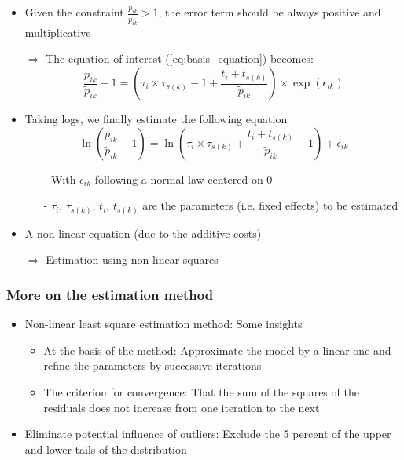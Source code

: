 \documentclass[10 pt,Helvetica, french]{beamer}
\begin{document}
\begin{frame}
\begin{itemize}
\item Given the constraint $\frac{p_{ik}}{\widetilde{p}_{ik}} >1$, the error term should be always positive and multiplicative \vspace{0.1cm}
\item[$\Rightarrow$] The equation of interest (\ref{eq:basis_equation}) becomes:
\footnotesize
$$\frac{p_{ik}}{\widetilde{p}_{ik}}-1 =\left(\tau_{i} \times \tau_{s(k)} -1+\frac{t_{i} + t_{s(k)}}{\widetilde{p}_{ik}} \right)\times \exp(\epsilon_{ik})$$
\normalsize
\item Taking logs, we finally estimate the following equation
\footnotesize
\begin{equation*}
\ln\left(\frac{p_{ik}}{\widetilde{p}_{ik}}-1 \right)= \ln \left(\tau_{i} \times \tau_{s(k)}+\frac{t_{i} + t_{s(k)}}{\widetilde{p}_{ik}}-1 \right) + \epsilon_{ik}
\end{equation*}
\normalsize
\begin{itemize}
\item[-] With $\epsilon_{ik}$ following a normal law centered on 0  \vspace{0.1cm}
\item[-] $\tau_i$, $\tau_{s(k)}$, $t_i$, $t_{s(k)}$ are the parameters (i.e. fixed effects) to be estimated
\end{itemize}
\item A non-linear equation (due to the additive costs)  \vspace{0.1cm}
\item[$\Rightarrow$] Estimation using non-linear squares 

\end{itemize}
\hyperlink{slide_empirical_strategy}{}
\end{frame}


\begin{frame}
\frametitle{More on the estimation method}
\begin{itemize}
\item Non-linear least square estimation method: Some insights \vspace{0.1cm}
\begin{itemize}
\item At the basis of the method: Approximate the model by a linear one and refine the parameters by successive iterations \vspace{0.1cm}
\item The criterion for convergence: That the sum of the squares of the residuals does not increase from one iteration to the next \vspace{0.2cm}
\end{itemize}
\item Eliminate potential influence of outliers: Exclude the 5 percent of the upper and lower tails of the distribution
\end{itemize}

\hyperlink{slide_empirical_strategy}{}
\end{frame}
\end{document}
